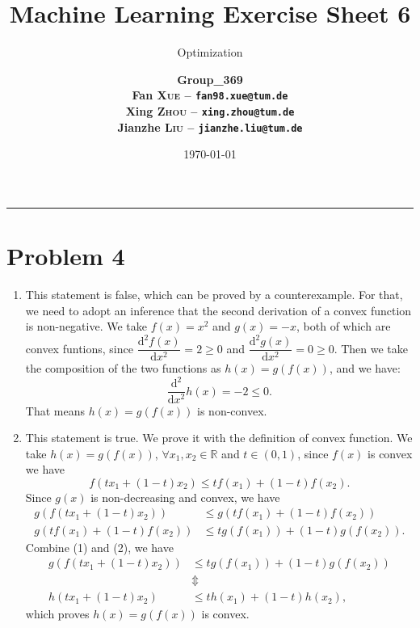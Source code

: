 \documentclass[12pt]{scrartcl}
\title{\large Machine Learning Exercise Sheet 6}
\subtitle{\Large Optimization}
\author{\large\bfseries Group\_369 \\
        \large Fan \textsc{Xue} -- \texttt{fan98.xue@tum.de} \\
        \large Xing \textsc{Zhou} -- \texttt{xing.zhou@tum.de} \\
        \large Jianzhe \textsc{Liu} -- \texttt{jianzhe.liu@tum.de}}
\date{\large \today}
\newcommand\R{\mathbb{R}}
\begin{document}
  \maketitle
  \vspace{-1cm}
  \noindent\rule{\textwidth}{0.4pt}
  \section*{Problem 4}

  \begin{enumerate}[label=\alph*)]
    \item This statement is false, which can be proved by a counterexample. For that, we need to adopt an inference that the second derivation of a convex function is non-negative.
    We take $f(x)=x^2$ and $g(x)=-x$, both of which are convex funtions, since $\dfrac{\mathrm{d}^{2}f(x)}{\mathrm{d}x^{2}}=2 \ge 0$ and $\dfrac{\mathrm{d^{2}}g(x)}{\mathrm{d}x^{2}}=0 \ge 0$.
    Then we take the composition of the two functions as $h(x)=g(f(x))$, and we have:
    \begin{equation*}
      \frac{\mathrm{d^{2}}}{\mathrm{d}x^{2}}h(x)=-2 \le 0.
    \end{equation*}
    That means $h(x)=g(f(x))$ is non-convex.
    \item This statement is true. We prove it with the definition of convex function. We take $h(x)=g(f(x))$, 
     $\forall x_{1},x_{2}\in \R$ and $t \in (0,1)$, since $f(x)$ is convex we have
    \begin{equation*}
      f\left( tx_{1}+(1-t)x_{2} \right) \le tf\left( x_{1} \right) + (1-t)f\left( x_{2} \right).
    \end{equation*}
    Since $g(x)$ is non-decreasing and convex, we have
    \begin{align}
      g\left(f\left( tx_{1}+(1-t)x_{2} \right)\right) &\le g\left( tf\left( x_{1} \right) + (1-t)f\left( x_{2} \right) \right) \\
      g\left( tf(x_1) + (1-t)f(x_2) \right) &\le tg\left( f(x_1) \right) + (1-t)g\left( f(x_2) \right).
    \end{align}
    Combine (1) and (2), we have
    \begin{align*}
      g\left(f\left( tx_{1}+(1-t)x_{2} \right)\right) &\le tg\left( f(x_1) \right) + (1-t)g\left( f(x_2) \right) \\
      &\Updownarrow \\
      h\left( tx_{1}+(1-t)x_{2} \right) &\le th(x_1) + (1-t)h(x_2),
    \end{align*}
    which proves $h(x)=g(f(x))$ is convex.
  \end{enumerate}
\end{document}
